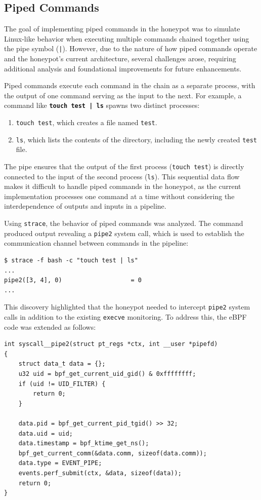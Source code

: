 \subsection{Piped Commands}
\label{sub:pipes}

The goal of implementing piped commands in the honeypot was to simulate Linux-like behavior when executing multiple commands chained together using the pipe symbol (\texttt{|}). However, due to the nature of how piped commands operate and the honeypot's current architecture, several challenges arose, requiring additional analysis and foundational improvements for future enhancements.

Piped commands execute each command in the chain as a separate process, with the output of one command serving as the input to the next. For example, a command like \textbf{\texttt{touch test | ls}} spawns two distinct processes:

\begin{enumerate}
    \item \texttt{touch test}, which creates a file named \texttt{test}.
    \item \texttt{ls}, which lists the contents of the directory, including the newly created \texttt{test} file.
\end{enumerate}

The pipe ensures that the output of the first process (\texttt{touch test}) is directly connected to the input of the second process (\texttt{ls}). This sequential data flow makes it difficult to handle piped commands in the honeypot, as the current implementation processes one command at a time without considering the interdependence of outputs and inputs in a pipeline.

Using \texttt{strace}, the behavior of piped commands was analyzed. The command produced output revealing a \texttt{pipe2} system call, which is used to establish the communication channel between commands in the pipeline:

\begin{lstlisting}
$ strace -f bash -c "touch test | ls"
... 
pipe2([3, 4], 0)                   = 0
... 
\end{lstlisting}

This discovery highlighted that the honeypot needed to intercept \texttt{pipe2} system calls in addition to the existing \texttt{execve} monitoring. To address this, the eBPF code was extended as follows:

\begin{lstlisting}
int syscall__pipe2(struct pt_regs *ctx, int __user *pipefd)
{
    struct data_t data = {};
    u32 uid = bpf_get_current_uid_gid() & 0xffffffff;
    if (uid != UID_FILTER) {
        return 0;
    }

    data.pid = bpf_get_current_pid_tgid() >> 32;
    data.uid = uid;
    data.timestamp = bpf_ktime_get_ns();
    bpf_get_current_comm(&data.comm, sizeof(data.comm));
    data.type = EVENT_PIPE;
    events.perf_submit(ctx, &data, sizeof(data));
    return 0;
}
\end{lstlisting}

